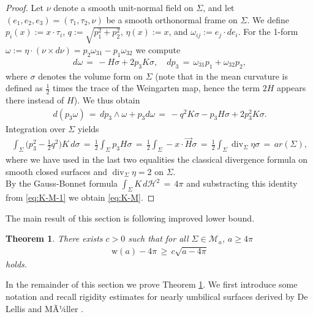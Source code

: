 \documentclass[reqno,makeidx,12pt]{amsart}
\theoremstyle{note}
\newtheorem{theorem}{Theorem}
\theoremstyle{definition}
\begin{document}
\begin{proof}
Let $\nu$ denote a smooth unit-normal field on $\Sigma$, and let $(e_1,e_2,e_3)=(\tau_1,\tau_2,\nu)$ be a smooth orthonormal frame on $\Sigma$. We define
$p_i(x):=x\cdot \tau_i$, $q:=\sqrt{p_1^2+p_2^2}$, $\eta(x):=x$, and $\omega_{ij} := e_j\cdot de_i$. For the
1-form $\omega:= \eta\cdot(\nu\times d\nu)= p_2\omega_{31}-p_1\omega_{32}$ we compute \cite[proof of Theorem 26]{AgFr02}
\begin{gather}
  d\omega\,=\, -H\sigma + 2p_3 K\sigma,\quad dp_3\,=\, \omega_{31}p_1 + \omega_{32}p_2,
  \label{eq:omega}
\end{gather}
where $\sigma$ denotes the volume form on $\Sigma$ (note that in \cite{AgFr02} the mean curvature is defined as $\frac{1}{2}$ times the trace of the Weingarten map, hence  the term $2H$ appears there instead of $H$). We thus obtain
\begin{gather*}
	d(p_3\omega)\,=\, dp_3\wedge \omega + p_3 d\omega \,=\, -q^2 K\sigma -p_3 H\sigma + 2p_3^2 K\sigma.
\end{gather*}
Integration over $\Sigma$ yields
\begin{gather}
  \int_\Sigma \big(p_3^2 - \frac{1}{2}q^2\big)K\,d\sigma \,=\,
  \frac{1}{2}\int_\Sigma p_3 H\sigma\,=\, \frac{1}{2}\int_\Sigma
  -x\cdot\vec{H}\sigma\,=\, \frac{1}{2}\int_\Sigma \operatorname{div}_{\Sigma}\eta \sigma \,=\, {ar}(\Sigma), \label{eq:K-M-1}
\end{gather}
where we have used in the last two equalities the classical divergence formula on smooth closed surfaces \cite[(7.6)]{Simo83} and $\operatorname{div}_{\Sigma}\eta=2$ on $\Sigma$.\\
By the Gauss-Bonnet formula $\int_\Sigma K\,d{\ensuremath{\mathcal{H}}}^2\,=\, 4\pi$ and
substracting 
this identity from \eqref{eq:K-M-1} we obtain \eqref{eq:K-M}.
\end{proof}
The main result of this section is following improved lower bound.
\begin{theorem}\label{thm:lb-4pi}
There exists $c>0$ such that for all $\Sigma\in{\mathcal{M}}_a$, $a\geq 4\pi$ 
\begin{gather}
	{\text{w}}(a)-4\pi\,\geq\, c\sqrt{a-4\pi} \label{eq:lb-4pi}
\end{gather}
holds.
\end{theorem}

In the remainder of this section we prove Theorem \ref{thm:lb-4pi}. We first introduce some notation and recall rigidity estimates for nearly umbilical surfaces derived by De Lellis and MÃ¼ller \cite{DeMu05,DeMu06}.
\end{document}
